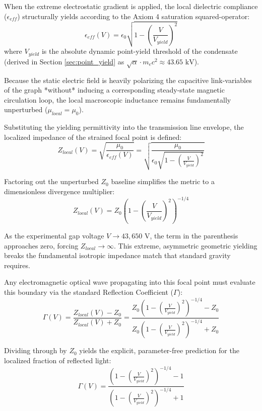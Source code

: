 When the extreme electrostatic gradient is applied, the local dielectric compliance ($\epsilon_{eff}$) structurally yields according to the Axiom 4 saturation squared-operator:
\begin{equation}
\epsilon_{eff}(V) = \epsilon_0 \sqrt{1 - \left(\frac{V}{V_{yield}}\right)^2}
\end{equation}
where $V_{yield}$ is the absolute dynamic point-yield threshold of the condensate (derived in Section \ref{sec:point_yield} as $\sqrt{\alpha} \cdot m_e c^2 \approx 43.65\text{ kV}$).

Because the static electric field is heavily polarizing the capacitive link-variables of the graph *without* inducing a corresponding steady-state magnetic circulation loop, the local macroscopic inductance remains fundamentally unperturbed ($\mu_{local} = \mu_0$).

Substituting the yielding permittivity into the transmission line envelope, the localized impedance of the strained focal point is defined:
\begin{equation}
Z_{local}(V) = \sqrt{\frac{\mu_0}{\epsilon_{eff}(V)}} = \sqrt{\frac{\mu_0}{\epsilon_0 \sqrt{1 - \left(\frac{V}{V_{yield}}\right)^2}}}
\end{equation}

Factoring out the unperturbed $Z_0$ baseline simplifies the metric to a dimensionless divergence multiplier:
\begin{equation}
Z_{local}(V) = Z_0 \left(1 - \left(\frac{V}{V_{yield}}\right)^2\right)^{-1/4}
\end{equation}

As the experimental gap voltage $V \to 43,650\text{ V}$, the term in the parenthesis approaches zero, forcing $Z_{local} \to \infty$. This extreme, asymmetric geometric yielding breaks the fundamental isotropic impedance match that standard gravity requires. 

Any electromagnetic optical wave propagating into this focal point must evaluate this boundary via the standard Reflection Coefficient ($\Gamma$):
\begin{equation}
\Gamma(V) = \frac{Z_{local}(V) - Z_{0}}{Z_{local}(V) + Z_{0}} = \frac{Z_0 \left(1 - \left(\frac{V}{V_{yield}}\right)^2\right)^{-1/4} - Z_0}{Z_0 \left(1 - \left(\frac{V}{V_{yield}}\right)^2\right)^{-1/4} + Z_0}
\end{equation}

Dividing through by $Z_0$ yields the explicit, parameter-free prediction for the localized fraction of reflected light:
\begin{equation}
\Gamma(V) = \frac{\left(1 - \left(\frac{V}{V_{yield}}\right)^2\right)^{-1/4} - 1}{\left(1 - \left(\frac{V}{V_{yield}}\right)^2\right)^{-1/4} + 1}
\end{equation}

